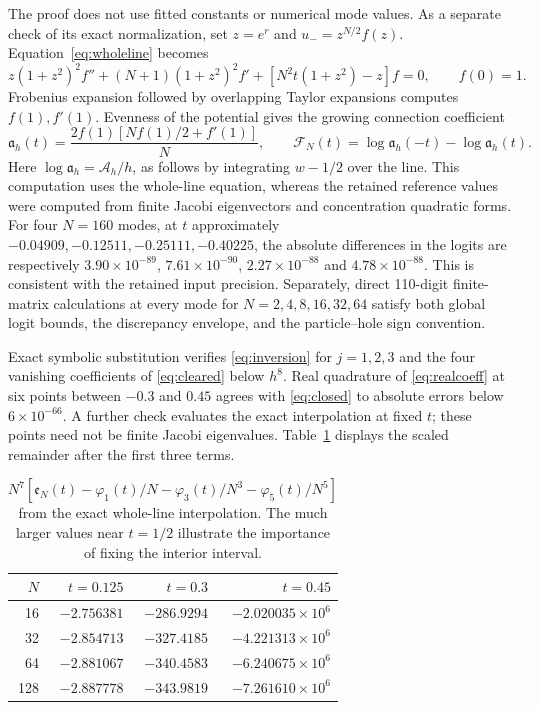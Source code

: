 \documentclass[10pt]{article}
\newcommand{\ph}{\varphi}
\begin{document}
The proof does not use fitted constants or numerical mode values.
As a separate check of its exact normalization, set $z=e^r$ and
$u_-=z^{N/2}f(z)$. Equation~\eqref{eq:wholeline} becomes
\begin{equation}
z(1+z^2)^2f''+(N+1)(1+z^2)^2f'
 +[N^2t(1+z^2)-z]f=0,\qquad f(0)=1.
\label{eq:numericalODE}
\end{equation}
Frobenius expansion followed by overlapping Taylor expansions
computes $f(1),f'(1)$. Evenness of the potential gives the growing
connection coefficient
\[
\mathfrak a_h(t)=\frac{2f(1)[Nf(1)/2+f'(1)]}{N},\qquad
\mathcal F_N(t)=\log\mathfrak a_h(-t)-\log\mathfrak a_h(t).
\]
Here $\log\mathfrak a_h=\mathcal A_h/h$, as follows by integrating
$w-1/2$ over the line. This computation uses the whole-line
equation, whereas the retained reference values were computed
from finite Jacobi eigenvectors and concentration quadratic forms.
For four $N=160$ modes, at $t$ approximately
$-0.04909,-0.12511,-0.25111,-0.40225$, the absolute differences
in the logits are respectively
$3.90\times10^{-89}$, $7.61\times10^{-90}$,
$2.27\times10^{-88}$ and $4.78\times10^{-88}$.
This is consistent with the retained input precision. Separately, direct
110-digit finite-matrix calculations at every mode for
$N=2,4,8,16,32,64$ satisfy both global logit bounds, the discrepancy
envelope, and the particle--hole sign convention.

Exact symbolic substitution verifies \eqref{eq:inversion} for
$j=1,2,3$ and the four vanishing coefficients of
\eqref{eq:cleared} below $h^8$. Real quadrature of
\eqref{eq:realcoeff} at six points between $-0.3$ and $0.45$
agrees with \eqref{eq:closed} to absolute errors below
$6\times10^{-66}$. A further check evaluates the exact
interpolation at fixed $t$; these points need not be finite
Jacobi eigenvalues. Table~\ref{tab:remainder} displays the scaled
remainder after the first three terms.

\begin{table}[ht]
\centering
\begin{tabular}{rrrr}
\toprule
$N$ & $t=0.125$ & $t=0.3$ & $t=0.45$\\
\midrule
16  & $-2.756381$ & $-286.9294$ & $-2.020035\times10^6$\\
32  & $-2.854713$ & $-327.4185$ & $-4.221313\times10^6$\\
64  & $-2.881067$ & $-340.4583$ & $-6.240675\times10^6$\\
128 & $-2.887778$ & $-343.9819$ & $-7.261610\times10^6$\\
\bottomrule
\end{tabular}
\caption{$N^7[\mathfrak e_N(t)-\ph_1(t)/N-\ph_3(t)/N^3-\ph_5(t)/N^5]$
from the exact whole-line interpolation. The much larger values
near $t=1/2$ illustrate the importance of fixing the interior interval.}
\label{tab:remainder}
\end{table}
\end{document}
